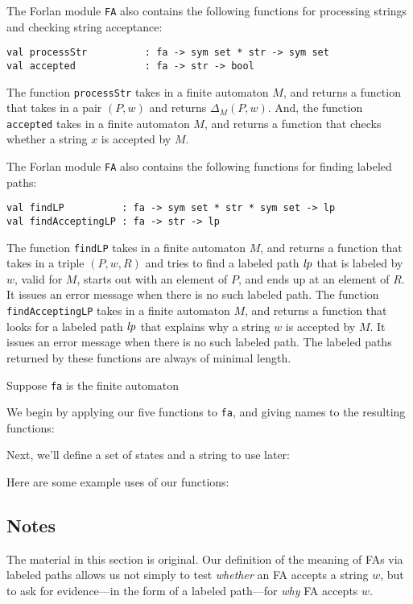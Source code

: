 The Forlan module \texttt{FA}
%
also contains the following functions
for processing strings and checking string acceptance:
\begin{verbatim}
val processStr          : fa -> sym set * str -> sym set
val accepted            : fa -> str -> bool
\end{verbatim}
%
%
The function \texttt{processStr} takes in a finite automaton $M$,
and returns a function that takes in a pair $(P, w)$ and returns
$\Delta_M(P, w)$.
And, the function \texttt{accepted} takes in a finite automaton $M$,
and returns a function that checks whether a string $x$ is
accepted by $M$.

The Forlan module \texttt{FA}
%
also contains the following functions for finding labeled paths:
\begin{verbatim}
val findLP          : fa -> sym set * str * sym set -> lp
val findAcceptingLP : fa -> str -> lp
\end{verbatim}
%
%
The function \texttt{findLP} takes in a finite automaton $M$, and
returns a function that takes in a triple $(P,w,R)$ and tries
to find a labeled path ${\it lp}$ that is labeled by $w$, valid for $M$,
starts out with an element of $P$, and ends up at an element of $R$.
It issues an error message when there is no such labeled path.
The function \texttt{findAcceptingLP} takes in a finite automaton $M$,
and returns a function that looks for a labeled path ${\it lp}$ that
explains why a string $w$ is accepted by $M$.  It issues an error
message when there is no such labeled path.  The labeled paths
returned by these functions are always of minimal length.

Suppose \texttt{fa} is the finite automaton
\begin{center}

\end{center}
We begin by applying our five functions to \texttt{fa}, and giving names
to the resulting functions:

Next, we'll define a set of states and a string to use later:

Here are some example uses of our functions:


\subsection{Notes}

The material in this section is original.  Our definition of the
meaning of FAs via labeled paths allows us not simply to test \emph{whether}
an FA accepts a string $w$, but to ask for evidence---in the form of a
labeled path---for \emph{why} FA accepts $w$.

%
%

